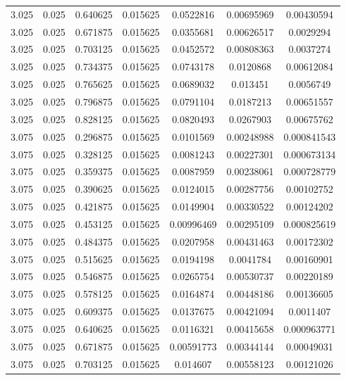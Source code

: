 \begin{table}[bh]
\begin{center}
{\begin{tabular}{ccccccc}
3.025	 & 0.025 & 	0.640625	 & 0.015625	 & 0.0522816	 & 0.00695969	 & 0.00430594 \\ 
3.025	 & 0.025 & 	0.671875	 & 0.015625	 & 0.0355681	 & 0.00626517	 & 0.0029294 \\ 
3.025	 & 0.025 & 	0.703125	 & 0.015625	 & 0.0452572	 & 0.00808363	 & 0.0037274 \\ 
3.025	 & 0.025 & 	0.734375	 & 0.015625	 & 0.0743178	 & 0.0120868	 & 0.00612084 \\ 
3.025	 & 0.025 & 	0.765625	 & 0.015625	 & 0.0689032	 & 0.013451	 & 0.0056749 \\ 
3.025	 & 0.025 & 	0.796875	 & 0.015625	 & 0.0791104	 & 0.0187213	 & 0.00651557 \\ 
3.025	 & 0.025 & 	0.828125	 & 0.015625	 & 0.0820493	 & 0.0267903	 & 0.00675762 \\ 
3.075	 & 0.025 & 	0.296875	 & 0.015625	 & 0.0101569	 & 0.00248988	 & 0.000841543 \\ 
3.075	 & 0.025 & 	0.328125	 & 0.015625	 & 0.0081243	 & 0.00227301	 & 0.000673134 \\ 
3.075	 & 0.025 & 	0.359375	 & 0.015625	 & 0.0087959	 & 0.00238061	 & 0.000728779 \\ 
3.075	 & 0.025 & 	0.390625	 & 0.015625	 & 0.0124015	 & 0.00287756	 & 0.00102752 \\ 
3.075	 & 0.025 & 	0.421875	 & 0.015625	 & 0.0149904	 & 0.00330522	 & 0.00124202 \\ 
3.075	 & 0.025 & 	0.453125	 & 0.015625	 & 0.00996469	 & 0.00295109	 & 0.000825619 \\ 
3.075	 & 0.025 & 	0.484375	 & 0.015625	 & 0.0207958	 & 0.00431463	 & 0.00172302 \\ 
3.075	 & 0.025 & 	0.515625	 & 0.015625	 & 0.0194198	 & 0.0041784	 & 0.00160901 \\ 
3.075	 & 0.025 & 	0.546875	 & 0.015625	 & 0.0265754	 & 0.00530737	 & 0.00220189 \\ 
3.075	 & 0.025 & 	0.578125	 & 0.015625	 & 0.0164874	 & 0.00448186	 & 0.00136605 \\ 
3.075	 & 0.025 & 	0.609375	 & 0.015625	 & 0.0137675	 & 0.00421094	 & 0.0011407 \\ 
3.075	 & 0.025 & 	0.640625	 & 0.015625	 & 0.0116321	 & 0.00415658	 & 0.000963771 \\ 
3.075	 & 0.025 & 	0.671875	 & 0.015625	 & 0.00591773	 & 0.00344144	 & 0.00049031 \\ 
3.075	 & 0.025 & 	0.703125	 & 0.015625	 & 0.014607	 & 0.00558123	 & 0.00121026 \\ 

\end{tabular}}
\end{center}
\end{table}

